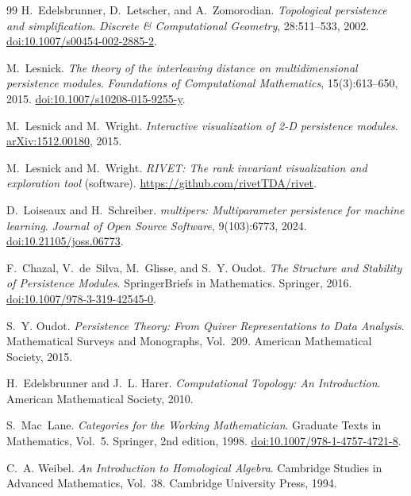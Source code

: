 \documentclass[11pt]{article}
\theoremstyle{definition}
\theoremstyle{remark}
\begin{document}
\begin{thebibliography}{99}
H.~Edelsbrunner, D.~Letscher, and A.~Zomorodian.
\newblock \emph{Topological persistence and simplification}.
\newblock \emph{Discrete \& Computational Geometry}, 28:511--533, 2002.
\newblock \href{https://doi.org/10.1007/s00454-002-2885-2}{doi:10.1007/s00454-002-2885-2}.

M.~Lesnick.
\newblock \emph{The theory of the interleaving distance on multidimensional persistence modules}.
\newblock \emph{Foundations of Computational Mathematics}, 15(3):613--650, 2015.
\newblock \href{https://doi.org/10.1007/s10208-015-9255-y}{doi:10.1007/s10208-015-9255-y}.

M.~Lesnick and M.~Wright.
\newblock \emph{Interactive visualization of 2-D persistence modules}.
\newblock \href{https://arxiv.org/abs/1512.00180}{arXiv:1512.00180}, 2015.

M.~Lesnick and M.~Wright.
\newblock \emph{RIVET: The rank invariant visualization and exploration tool} (software).
\newblock \url{https://github.com/rivetTDA/rivet}.

D.~Loiseaux and H.~Schreiber.
\newblock \emph{multipers: Multiparameter persistence for machine learning}.
\newblock \emph{Journal of Open Source Software}, 9(103):6773, 2024.
\newblock \href{https://doi.org/10.21105/joss.06773}{doi:10.21105/joss.06773}.

F.~Chazal, V.~de~Silva, M.~Glisse, and S.~Y. Oudot.
\newblock \emph{The Structure and Stability of Persistence Modules}.
\newblock SpringerBriefs in Mathematics. Springer, 2016.
\newblock \href{https://doi.org/10.1007/978-3-319-42545-0}{doi:10.1007/978-3-319-42545-0}.

S.~Y. Oudot.
\newblock \emph{Persistence Theory: From Quiver Representations to Data Analysis}.
\newblock Mathematical Surveys and Monographs, Vol.~209. American Mathematical Society, 2015.

H.~Edelsbrunner and J.~L. Harer.
\newblock \emph{Computational Topology: An Introduction}.
\newblock American Mathematical Society, 2010.

S.~Mac~Lane.
\newblock \emph{Categories for the Working Mathematician}.
\newblock Graduate Texts in Mathematics, Vol.~5. Springer, 2nd edition, 1998.
\newblock \href{https://doi.org/10.1007/978-1-4757-4721-8}{doi:10.1007/978-1-4757-4721-8}.

C.~A. Weibel.
\newblock \emph{An Introduction to Homological Algebra}.
\newblock Cambridge Studies in Advanced Mathematics, Vol.~38. Cambridge University Press, 1994.


\end{thebibliography}
\end{document}
